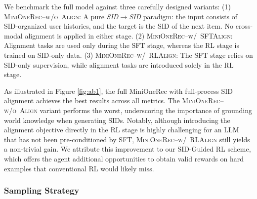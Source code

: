 We benchmark the full model against three carefully designed variants:
(1) \textsc{MiniOneRec}--\textsc{w/o~Align}: A pure \textit{SID$\rightarrow$SID} paradigm: the input consists of SID-organized user histories, and the target is the SID of the next item. No cross-modal alignment is applied in either stage. 
(2) \textsc{MiniOneRec}--\textsc{w/~SFTAlign}: Alignment tasks are used only during the SFT stage, whereas the RL stage is trained on SID-only data.
(3) \textsc{MiniOneRec}--\textsc{w/~RLAlign}: The SFT stage relies on SID-only supervision, while alignment tasks are introduced solely in the RL stage.

As illustrated in Figure \ref{fig:ab1}, the full MiniOneRec with full-process SID alignment achieves the best results across all metrics. The \textsc{MiniOneRec}--\textsc{w/o~Align} variant performs the worst, underscoring the importance of grounding world knowledge when generating SIDs. Notably, although introducing the alignment objective directly in the RL stage is highly challenging for an LLM that has not been pre-conditioned by SFT, \textsc{MiniOneRec}--\textsc{w/~RLAlign} still yields a non-trivial gain. We attribute this improvement to our SID-Guided RL scheme, which offers the agent additional opportunities to obtain valid rewards on hard examples that conventional RL would likely miss.

\subsubsection{Sampling Strategy}

